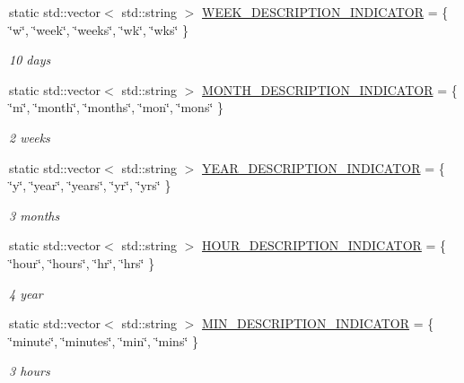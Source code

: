 \begin{DoxyCompactItemize}
static std\+::vector$<$ std\+::string $>$ \hyperlink{class_do_lah_1_1_date_time_parser_a622cd79bd79480fd69ad6161ccae07dc}{W\+E\+E\+K\+\_\+\+D\+E\+S\+C\+R\+I\+P\+T\+I\+O\+N\+\_\+\+I\+N\+D\+I\+C\+A\+T\+O\+R} = \{ \char`\"{}w\char`\"{}, \char`\"{}week\char`\"{}, \char`\"{}weeks\char`\"{}, \char`\"{}wk\char`\"{}, \char`\"{}wks\char`\"{} \}
\begin{DoxyCompactList}\small\item\em 10 days \end{DoxyCompactList}\item 
static std\+::vector$<$ std\+::string $>$ \hyperlink{class_do_lah_1_1_date_time_parser_a9e5d75c4251b0035d4debcc8ff6ce713}{M\+O\+N\+T\+H\+\_\+\+D\+E\+S\+C\+R\+I\+P\+T\+I\+O\+N\+\_\+\+I\+N\+D\+I\+C\+A\+T\+O\+R} = \{ \char`\"{}m\char`\"{}, \char`\"{}month\char`\"{}, \char`\"{}months\char`\"{}, \char`\"{}mon\char`\"{}, \char`\"{}mons\char`\"{} \}
\begin{DoxyCompactList}\small\item\em 2 weeks \end{DoxyCompactList}\item 
static std\+::vector$<$ std\+::string $>$ \hyperlink{class_do_lah_1_1_date_time_parser_af2324a9dc5ed95d1d31d584bbb1e869c}{Y\+E\+A\+R\+\_\+\+D\+E\+S\+C\+R\+I\+P\+T\+I\+O\+N\+\_\+\+I\+N\+D\+I\+C\+A\+T\+O\+R} = \{ \char`\"{}y\char`\"{}, \char`\"{}year\char`\"{}, \char`\"{}years\char`\"{}, \char`\"{}yr\char`\"{}, \char`\"{}yrs\char`\"{} \}
\begin{DoxyCompactList}\small\item\em 3 months \end{DoxyCompactList}\item 
static std\+::vector$<$ std\+::string $>$ \hyperlink{class_do_lah_1_1_date_time_parser_a53e2831a83514941d8a6d77855d6d409}{H\+O\+U\+R\+\_\+\+D\+E\+S\+C\+R\+I\+P\+T\+I\+O\+N\+\_\+\+I\+N\+D\+I\+C\+A\+T\+O\+R} = \{ \char`\"{}hour\char`\"{}, \char`\"{}hours\char`\"{}, \char`\"{}hr\char`\"{}, \char`\"{}hrs\char`\"{} \}
\begin{DoxyCompactList}\small\item\em 4 year \end{DoxyCompactList}\item 
static std\+::vector$<$ std\+::string $>$ \hyperlink{class_do_lah_1_1_date_time_parser_af9a3cc6e4d648744d460b5475cadccee}{M\+I\+N\+\_\+\+D\+E\+S\+C\+R\+I\+P\+T\+I\+O\+N\+\_\+\+I\+N\+D\+I\+C\+A\+T\+O\+R} = \{ \char`\"{}minute\char`\"{}, \char`\"{}minutes\char`\"{}, \char`\"{}min\char`\"{}, \char`\"{}mins\char`\"{} \}
\begin{DoxyCompactList}\small\item\em 3 hours \end{DoxyCompactList}\item 

\end{DoxyCompactItemize}
